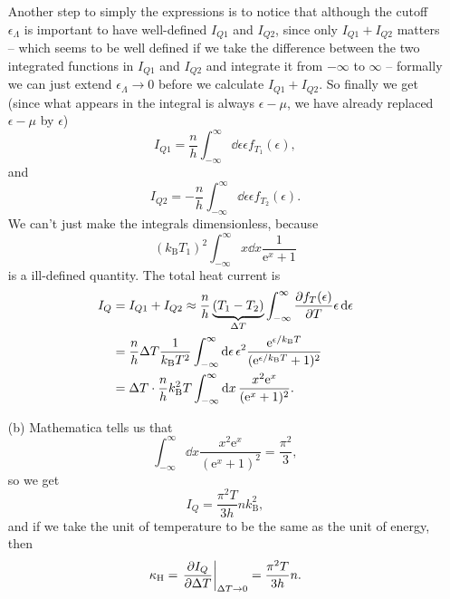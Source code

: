 \documentclass[hyperref, a4paper]{article}
\newcommand*{\ee}{\mathrm{e}}
\begin{document}
\begin{itemize}
Another step to simply the expressions is to notice that 
although the cutoff $\epsilon_\Lambda$ is important to have well-defined $I_{Q1}$ and $I_{Q2}$,
since only $I_{Q1} + I_{Q2}$ matters 
-- which seems to be well defined 
if we take the difference between the two integrated functions in $I_{Q1}$ and $I_{Q2}$ 
and integrate it from $-\infty$ to $\infty$ -- 
formally we can just extend $\epsilon_\Lambda \to 0$ before we calculate $I_{Q1} + I_{Q2}$.
So finally we get 
(since what appears in the integral is always $\epsilon - \mu$,
we have already replaced $\epsilon - \mu$ by $\epsilon$)
\begin{equation}
    I_{Q1} = \frac{n}{h} \int^\infty_{-\infty} \dd{\epsilon} \epsilon f_{T_1}(\epsilon) , 
\end{equation}
and 
\begin{equation}
    I_{Q2} = - \frac{n}{h} \int^\infty_{-\infty} \dd{\epsilon} \epsilon f_{T_2}(\epsilon).
\end{equation}
We can't just make the integrals dimensionless, because 
\[
    (k_{\text{B}} T_1)^2 \int^\infty_{-\infty} x \dd{x} \frac{1}{\ee^{x} + 1}
\]
is a ill-defined quantity.
The total heat current is 
\begin{equation}
    \begin{aligned}
        I_Q &= I_{Q1} + I_{Q2} \approx
        \frac{n}{h} \underbrace{(T_1 - T_2)}_{\Delta T} \int^\infty_{-\infty} \pdv{f_T(\epsilon)}{T} \epsilon \dd{\epsilon} \\
        &= \frac{n}{h} \Delta T \frac{1}{k_{\text{B}} T^2} 
        \int^\infty_{-\infty} \dd{\epsilon} \epsilon^2 \frac{\ee^{\epsilon / k_{\text{B}} T}}{(\ee^{\epsilon / k_{\text{B}} T} + 1)^2} \\
        &= \Delta T \cdot \frac{n}{h} k_{\text{B}}^2 T 
        \int^\infty_{-\infty}  \dd{x} \frac{x^2 \ee^x}{(\ee^x + 1)^2}.
    \end{aligned}
    \label{eq:delta-t-i-q}
\end{equation}

\item[(b)] Mathematica tells us that  
\begin{equation}
    \int^\infty_{-\infty}  \dd{x} \frac{x^2 \ee^x}{(\ee^x + 1)^2} = \frac{\pi^2}{3},
\end{equation}
so we get 
\begin{equation}
    I_Q = \frac{\pi^2 T}{3h} n k_{\text{B}}^2,
\end{equation}
and if we take the unit of temperature to be the same as the unit of energy, then 
\begin{equation}
    \kappa_{\text{H}} = \eval{\pdv{I_Q}{\Delta T}}_{\Delta T \to 0} = \frac{\pi^2 T}{3h} n.
\end{equation}


\end{itemize}
\end{document}
